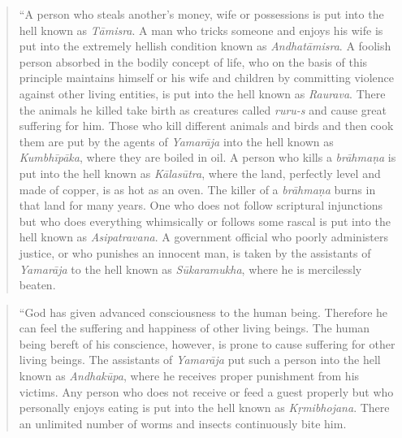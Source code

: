 \begin{quote}
``A person who steals another's money, wife or possessions is put into the hell known as \emph{Tāmisra}. A man who tricks someone and enjoys his wife is put into the extremely hellish condition known as \emph{Andhatāmisra}. A foolish person absorbed in the bodily concept of life, who on the basis of this principle maintains himself or his wife and children by committing violence against other living entities, is put into the hell known as \emph{Raurava}. There the animals he killed take birth as creatures called \emph{ruru-s} and cause great suffering for him. Those who kill different animals and birds and then cook them are put by the agents of \emph{Yamarāja} into the hell known as \emph{Kumbhīpāka}, where they are boiled in oil. A person who kills a \emph{brāhmaṇa} is put into the hell known as \emph{Kālasūtra}, where the land, perfectly level and made of copper, is as hot as an oven. The killer of a \emph{brāhmaṇa} burns in that land for many years. One who does not follow scriptural injunctions but who does everything whimsically or follows some rascal is put into the hell known as \emph{Asipatravana}. A government official who poorly administers justice, or who punishes an innocent man, is taken by the assistants of \emph{Yamarāja} to the hell known as \emph{Sūkaramukha}, where he is mercilessly beaten.
\end{quote}

\begin{quote}
``God has given advanced consciousness to the human being. Therefore he can feel the suffering and happiness of other living beings. The human being bereft of his conscience, however, is prone to cause suffering for other living beings. The assistants of \emph{Yamarāja} put such a person into the hell known as \emph{Andhakūpa}, where he receives proper punishment from his victims. Any person who does not receive or feed a guest properly but who personally enjoys eating is put into the hell known as \emph{Kṛmibhojana}. There an unlimited number of worms and insects continuously bite him.
\end{quote}

